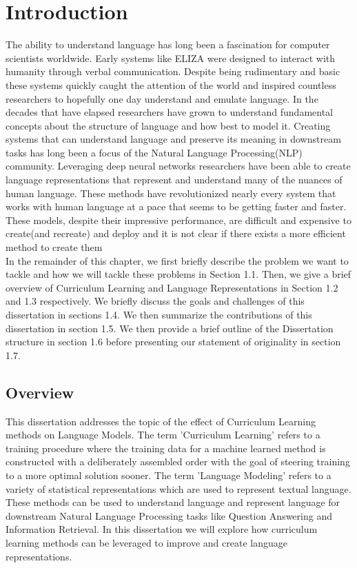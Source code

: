 \chapter {Introduction}
The ability to understand language has long been a fascination for computer scientists worldwide. Early systems like ELIZA \cite{Weizenbaum1966ELIZAA} were designed to interact with humanity through verbal communication. Despite being rudimentary and basic these systems quickly caught the attention of the world and inspired countless researchers to hopefully one day understand and emulate language.  In the decades that have elapsed researchers have grown to understand fundamental concepts about the structure of language and how best to model it. Creating systems that can understand language and preserve its meaning in downstream tasks has long been a focus of the Natural Language Processing(NLP) community. Leveraging deep neural networks researchers have been able to create language representations that represent and understand many of the nuances of human language. These methods have revolutionized nearly every system that works with human language at a pace that seems to be getting faster and faster. These models, despite their impressive performance, are difficult and expensive to create(and recreate) and deploy and it is not clear if there exists a more efficient method to create them \\
In the remainder of this chapter, we first briefly describe the problem we want to tackle and how we will tackle these problems in Section 1.1. Then, we give a brief overview of Curriculum Learning and Language Representations in Section 1.2 and 1.3 respectively. We briefly discuss the goals and challenges of this dissertation in sections 1.4. We then summarize the contributions of this dissertation in section 1.5. We then provide a brief outline of the Dissertation structure in section 1.6 before presenting our statement of originality in section 1.7.
\section{Overview}
This dissertation addresses the topic of the effect of Curriculum Learning methods on Language Models. The term 'Curriculum Learning' refers to a training procedure where the training data for a machine learned method is constructed with a deliberately assembled order with the goal of steering training to a more optimal solution sooner. The term 'Language Modeling' refers to a variety of statistical representations which are used to represent textual language. These methods can be used to understand language and represent language for downstream Natural Language Processing tasks like Question Answering and Information Retrieval. In this dissertation we will explore how curriculum learning methods can be leveraged to improve and create language representations.
